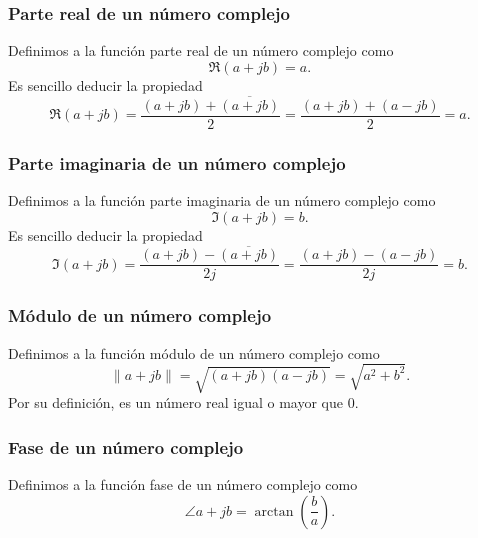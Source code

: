 \subsubsection{Parte real de un n\'{u}mero complejo}

Definimos a la funci\'{o}n parte real de un n\'{u}mero complejo como
\begin{equation}
  \Re{ \left( a + j b \right)} = a.
\end{equation}
Es sencillo deducir la propiedad
\begin{equation}
  \Re{ \left( a + j b \right)} = 
  \frac{(a + j b) + \overline{(a + j b)}}{2} =  \frac{(a + j b) + (a - j b)}{2} = a.
\end{equation}

\subsubsection{Parte imaginaria de un n\'{u}mero complejo}

Definimos a la funci\'{o}n parte imaginaria de un n\'{u}mero complejo
como
\begin{equation}
  \Im{\left( a + j b \right)} = b.
\end{equation}
Es sencillo deducir la propiedad
\begin{equation}
  \Im{ \left( a + j b \right)} = 
  \frac{(a + j b) - \overline{(a + j b)}}{2 j} =  \frac{(a + j b) - (a - j b)}{2 j} = b.
\end{equation}

\subsubsection{M\'{o}dulo de un n\'{u}mero complejo}

Definimos a la funci\'{o}n m\'{o}dulo de un n\'{u}mero complejo como
\begin{equation}
  \| a + j b \| = \sqrt{\left(a + j b\right)\left(a - j b\right)} = \sqrt{ a^{2} + b^{2}}.
\end{equation}
Por su definici\'{o}n, es un n\'{u}mero real igual o mayor que $0$.

\subsubsection{Fase de un n\'{u}mero complejo}

Definimos a la funci\'{o}n fase de un n\'{u}mero complejo como
\begin{equation}
  \angle a + j b  = \arctan (\frac{b}{a}).
\end{equation}

